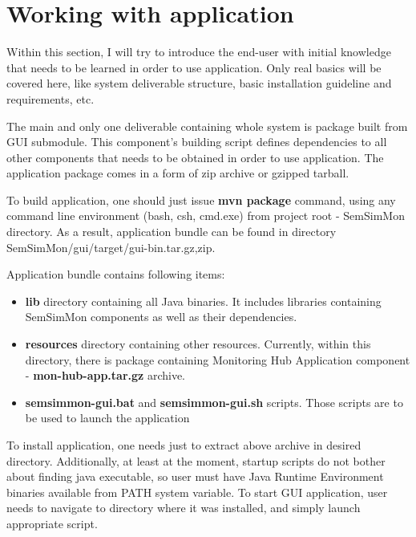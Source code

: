 %


\section{Working with application}
\label{sec:ch7_working_with}

Within this section, I will try to introduce the end-user with initial knowledge that needs to be learned in order to use application. Only real basics will be covered here, like system deliverable structure, basic installation guideline and requirements, etc.

The main and only one deliverable containing whole system is package built from GUI submodule. This component\rq{}s building script defines dependencies to all other components that needs to be obtained in order to use application. The application package comes in a form of zip archive or gzipped tarball. 

To build application, one should just issue {\bf mvn package} command, using any command line environment (bash, csh, cmd.exe) from project root - SemSimMon directory. As a result, application bundle can be found in directory SemSimMon/gui/target/gui-bin.{tar.gz,zip}.

Application bundle contains following items:
\begin{itemize}
  \item {\bf lib} directory containing all Java binaries. It includes libraries containing SemSimMon components as well as their dependencies.
  \item {\bf resources} directory containing other resources. Currently, within this directory, there is package containing Monitoring Hub Application component - {\bf mon-hub-app.tar.gz} archive.
  \item {\bf semsimmon-gui.bat} and {\bf semsimmon-gui.sh} scripts. Those scripts are to be used to launch the application	
\end{itemize}  

To install application, one needs just to extract above archive in desired directory. Additionally, at least at the moment, startup scripts do not bother about finding java executable, so user must have Java Runtime Environment binaries available from PATH system variable. To start GUI application, user needs to navigate to directory where it was installed, and simply launch appropriate script.


